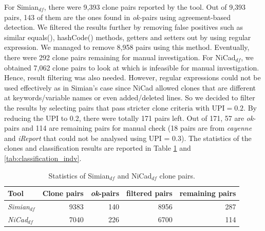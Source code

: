 \documentclass{IEEEtran}
\begin{document}
For Simian$_{df}$, there were 9,393 clone pairs reported by the tool. Out of 9,393 pairs, 143 of them are the ones found in \textit{ok-}pairs using agreement-based detection. We filtered the results further by removing false positives such as similar equals(), hashCode() methods, getters and setters out by using regular expression. We managed to remove 8,958 pairs using this method. Eventually, there were 292 clone pairs remaining for manual investigation. For NiCad$_{df}$, we obtained 7,062 clone pairs to look at which is infeasible for manual investigation. Hence, result filtering was also needed. However, regular expressions could not be used effectively as in Simian's case since NiCad allowed clones that are different at keywords/variable names or even added/deleted lines. So we decided to filter the results by selecting pairs that pass stricter clone criteria with $\mathrm{UPI} = 0.2$. By reducing the UPI to 0.2, there were totally 171 pairs left. Out of 171, 57 are \textit{ok}-pairs and 114 are remaining pairs for manual check (18 pairs are from \textit{cayenne} and \textit{iReport} that could not be analysed using UPI = 0.3). The statistics of the clones and classification results are reported in Table \ref{tab:classification_indv_stats} and \ref{tab:classification_indv}.


\begin{table}[H]
	\centering
	\caption{Statistics of Simian$_{df}$ and NiCad$_{df}$ clone pairs.}
	\label{tab:classification_indv_stats}
	\begin{tabular}{l|r|r|r|r}
		\hline 
		Tool & Clone pairs & \textit{ok}-pairs & filtered pairs & remaining pairs \\ 
		\hline 
		\multirow{1}{*}{\textit{Simian$_{df}$}} & 9383 & 140 & 8956 & 287 \\
		\hline
		\multirow{1}{*}{\textit{NiCad$_{df}$}} & 7040  & 226 & 6700 & 114 \\
		\hline
	\end{tabular} 
\end{table}
\end{document}
